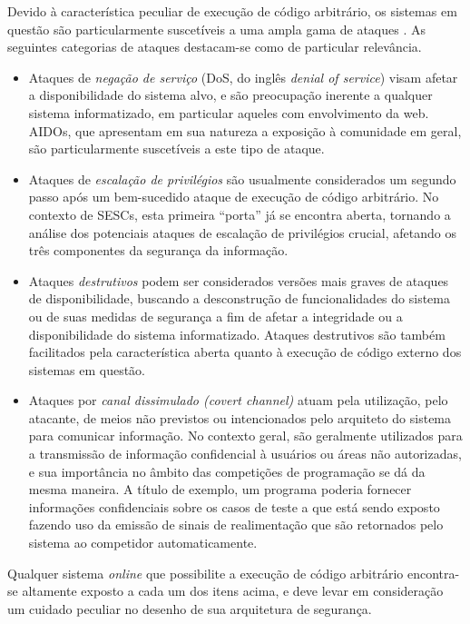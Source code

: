 \documentclass[ruledheader, 12pt]{abnt}
\begin{document}
Devido à característica peculiar de execução de código arbitrário, os sistemas em questão são particularmente suscetíveis a uma ampla gama de ataques \cite{tochev2010,forisek2006security}. As seguintes categorias de ataques destacam-se como de particular relevância.
\begin{itemize}
	\item Ataques de \emph{negação de serviço} (DoS, do inglês \emph{denial of service}) visam afetar a disponibilidade do sistema alvo, e são preocupação inerente a qualquer sistema informatizado, em particular aqueles com envolvimento da web. AIDOs, que apresentam em sua natureza a exposição à comunidade em geral, são particularmente suscetíveis a este tipo de ataque.
	
	\item Ataques de \emph{escalação de privilégios} são usualmente considerados um segundo passo após um bem-sucedido ataque de execução de código arbitrário. No contexto de SESCs, esta primeira ``porta'' já se encontra aberta, tornando a análise dos potenciais ataques de escalação de privilégios crucial, afetando os três componentes da segurança da informação.
	
	\item Ataques \emph{destrutivos} podem ser considerados versões mais graves de ataques de disponibilidade, buscando a desconstrução de funcionalidades do sistema ou de suas medidas de segurança a fim de afetar a integridade ou a disponibilidade do sistema informatizado. Ataques destrutivos são também facilitados pela característica aberta quanto à execução de código externo dos sistemas em questão.
	
	\item Ataques por \emph{canal dissimulado (covert channel)} atuam pela utilização, pelo atacante, de meios não previstos ou intencionados pelo arquiteto do sistema para comunicar informação. No contexto geral, são geralmente utilizados para a transmissão de informação confidencial à usuários ou áreas não autorizadas, e sua importância no âmbito das competições de programação se dá da mesma maneira. A título de exemplo, um programa poderia fornecer informações confidenciais sobre os casos de teste a que está sendo exposto fazendo uso da emissão de sinais de realimentação que são retornados pelo sistema ao competidor automaticamente.
\end{itemize}

Qualquer sistema \emph{online} que possibilite a execução de código arbitrário encontra-se altamente exposto a cada um dos itens acima, e deve levar em consideração um cuidado peculiar no desenho de sua arquitetura de segurança.
\end{document}
